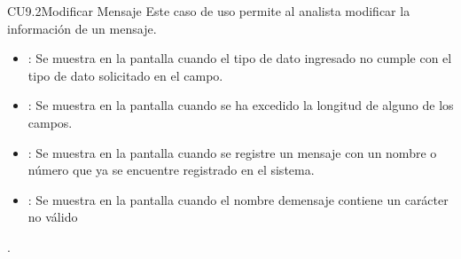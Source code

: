 \begin{UseCase}{CU9.2}{Modificar Mensaje}{
		Este caso de uso permite al analista modificar la información de un mensaje.
	}
{\begin{itemize}
		\item {}: Se muestra en la pantalla  cuando el tipo de dato ingresado no cumple con el tipo de dato solicitado en el campo.
		\item {}: Se muestra en la pantalla  cuando se ha excedido la longitud de alguno de los campos.
		\item {}: Se muestra en la pantalla  cuando se registre un mensaje con un nombre o número que ya se encuentre registrado en el sistema.
		\item {}: Se muestra en la pantalla  cuando el nombre demensaje contiene un carácter no válido
		\end{itemize}.
		}
	\end{UseCase}
